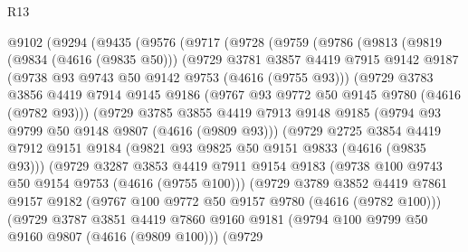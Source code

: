 \begin{lexlean}{R13}
\begin{coremodule}
  @9102
    (@9294
      (@9435
        (@9576
          (@9717
            (@9728
              (@9759
                (@9786
                  (@9813
                    (@9819
                      (@9834 (@4616 (@9835 @50)))
                      (@9729
                        @3781
                        @3857
                        @4419
                        @7915
                        @9142
                        @9187
                        (@9738 @93 @9743 @50 @9142 @9753 (@4616 (@9755 @93)))
                        (@9729
                          @3783
                          @3856
                          @4419
                          @7914
                          @9145
                          @9186
                          (@9767 @93 @9772 @50 @9145 @9780 (@4616 (@9782 @93)))
                          (@9729
                            @3785
                            @3855
                            @4419
                            @7913
                            @9148
                            @9185
                            (@9794 @93 @9799 @50 @9148 @9807 (@4616 (@9809 @93)))
                            (@9729
                              @2725
                              @3854
                              @4419
                              @7912
                              @9151
                              @9184
                              (@9821 @93 @9825 @50 @9151 @9833 (@4616 (@9835 @93)))
                              (@9729
                                @3287
                                @3853
                                @4419
                                @7911
                                @9154
                                @9183
                                (@9738 @100 @9743 @50 @9154 @9753 (@4616 (@9755 @100)))
                                (@9729
                                  @3789
                                  @3852
                                  @4419
                                  @7861
                                  @9157
                                  @9182
                                  (@9767 @100 @9772 @50 @9157 @9780 (@4616 (@9782 @100)))
                                  (@9729
                                    @3787
                                    @3851
                                    @4419
                                    @7860
                                    @9160
                                    @9181
                                    (@9794 @100 @9799 @50 @9160 @9807 (@4616 (@9809 @100)))
                                    (@9729

\end{coremodule}
\end{lexlean}

